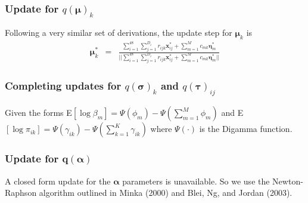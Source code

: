 \documentclass{beamer}
\numberwithin{equation}{section}
\begin{document}
\begin{frame}
\frametitle{Update for $q(\boldsymbol{\mu})_{k}$ }
Following a very similar set of derivations, the update step for $\boldsymbol{\mu}_{k}$ is
\begin{eqnarray}
\boldsymbol{\mu}_{k}^{*} & = & \frac{ \sum_{i=1}^{48}\sum_{j=1}^{D_{i}} r_{ijk} \boldsymbol{x}_{ij}^{*}  + \sum_{m=1}^{M} c_{mk} \boldsymbol{\eta}^{*}_{m} }{||\sum_{i=1}^{48}\sum_{j=1}^{D_{i}} r_{ijk} \boldsymbol{x}_{ij}^{*}  + \sum_{m=1}^{M} c_{mk} \boldsymbol{\eta}^{*}_{m}|| } \nonumber
\end{eqnarray}
\end{frame}

\begin{frame}
\frametitle{Completing updates for $q(\boldsymbol{\sigma})_{k}$ and $q(\boldsymbol{\tau})_{ij}$}
Given the forms E$[\log \beta_{m} ] = \Psi(\phi_{m} ) - \Psi(\sum_{m=1}^{M} \phi_{m} ) $ and E$[\log \pi_{ik} ] = \Psi(\gamma_{ik} ) - \Psi(\sum_{k=1}^{K} \gamma_{ik} ) $ where $\Psi(\cdot)$ is the Digamma function.

\end{frame}
\begin{frame}
\frametitle{Update for q$(\boldsymbol{\alpha})$}

A closed form update for the $\boldsymbol{\alpha}$ parameters is unavailable.  So we use the Newton-Raphson algorithm outlined in Minka (2000) and Blei, Ng, and Jordan (2003).
\end{frame}
\end{document}
